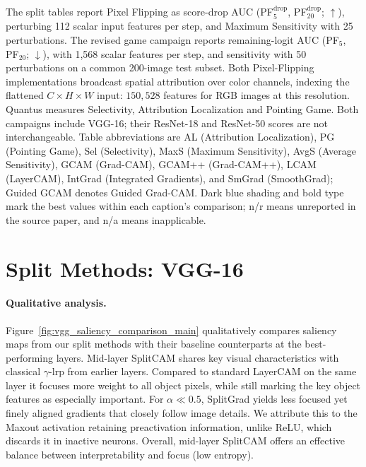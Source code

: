 The split tables report Pixel Flipping as score-drop AUC (PF$^{\mathrm{drop}}_5$, PF$^{\mathrm{drop}}_{20}$; $\uparrow$), perturbing 112 scalar input features per step, and Maximum Sensitivity with 25 perturbations. The revised game campaign reports remaining-logit AUC (PF$_5$, PF$_{20}$; $\downarrow$), with 1,568 scalar features per step, and sensitivity with 50 perturbations on a common 200-image test subset. Both Pixel-Flipping implementations broadcast spatial attribution over color channels, indexing the flattened $C\times H\times W$ input: $150{,}528$ features for RGB images at this resolution. Quantus measures Selectivity, Attribution Localization and Pointing Game. Both campaigns include VGG-16; their ResNet-18 and ResNet-50 scores are not interchangeable. Table abbreviations are AL (Attribution Localization), PG (Pointing Game), Sel (Selectivity), MaxS (Maximum Sensitivity), AvgS (Average Sensitivity), GCAM (Grad-CAM), GCAM++ (Grad-CAM++), LCAM (LayerCAM), IntGrad (Integrated Gradients), and SmGrad (SmoothGrad); Guided GCAM denotes Guided Grad-CAM. Dark blue shading and bold type mark the best values within each caption's comparison; n/r means unreported in the source paper, and n/a means inapplicable.

\section{Split Methods: VGG-16}\label{sec:results_vgg}



\paragraph{Qualitative analysis.}
Figure~\ref{fig:vgg_saliency_comparison_main} qualitatively compares saliency maps from our split methods with their baseline counterparts at the best-performing layers. Mid-layer SplitCAM shares key visual characteristics with classical $\gamma$-\ac{lrp} from earlier layers. Compared to standard LayerCAM on the same layer it focuses more weight to all object pixels, while still marking the key object features as especially important. For $\alpha \ll 0.5$, SplitGrad yields less focused yet finely aligned gradients that closely follow image details. We attribute this to the Maxout activation retaining preactivation information, unlike ReLU, which discards it in inactive neurons. Overall, mid-layer SplitCAM offers an effective balance between interpretability and focus (low entropy).

